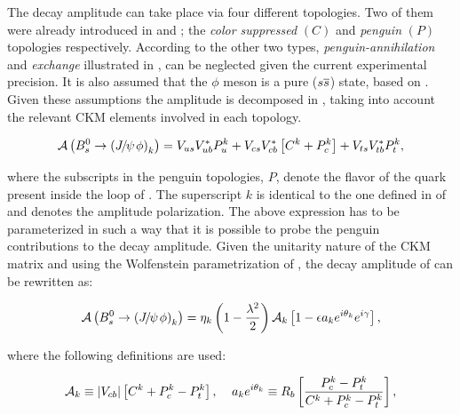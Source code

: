 The \BsJpsiPhi decay amplitude can take place via four different topologies.
Two of them were already introduced in  and ;
the {\it color suppressed }$(C)$ and {\it penguin} $(P)$ topologies respectively.
According to \cite{DeBruyn-thesis,DeBruyn:2014oga} the other two types, {\it penguin-annihilation}
and {\it exchange} illustrated in , can be neglected given the current experimental precision.
It is also assumed that the $\phi$ meson is a pure ($s\overline {s}$) state, based on \cite{Faller:2008gt}.
Given these assumptions the \BsJpsiPhi amplitude is decomposed in ,
taking into account the relevant CKM elements involved in each topology.

\begin{equation}
\mathcal{A} \left( B^0_s\rightarrow \left({J\mskip -3mu/\mskip -2mu\psi\mskip 2mu} \phi\right)_{k} \right) = V_{us}V_{ub}^*P_{u}^k + V_{cs}V_{cb}^*\left[ C^k +P_{c}^k \right] + V_{ts}V_{tb}^*P_{t}^k,
 \label{bsjpsiphi_amp}
\end{equation}

\noindent where the subscripts in the penguin topologies, $P$, denote the flavor of the quark present inside
the loop of . The superscript $k$ is identical to the one defined in 
of  and denotes the \BsJpsiPhi amplitude polarization.
The above expression has to be parameterized in such a way that it is possible to probe the penguin contributions to
the \BsJpsiPhi decay amplitude. Given the unitarity nature of the CKM matrix and using the Wolfenstein parametrization
of , the decay amplitude of  can be rewritten as:

\begin{equation}
  \mathcal{A} \left( B^0_s\rightarrow \left({J\mskip -3mu/\mskip -2mu\psi\mskip 2mu} \phi\right)_{k} \right) = \eta_k  \left( 1-\frac{\lambda^2}{2} \right) \mathcal{A}_{k} \left[  1 - \epsilon a_k e^{i\theta_k} e^{i\gamma}  \right],
 \label{bsjpsiphi_amp_param}
\end{equation}

\noindent where the following definitions are used:

\begin{equation}
  \mathcal{A}_{k} \equiv |V_{cb}| \left[ C^k + P_c^k - P_t^k \right], \;\;\;\; a_k e^{i\theta_k} \equiv R_b \left[  \frac{P_c^k - P_t^k}{C^k + P_c^k - P_t^k}  \right],
  \label{bsjpsiphi_amp_param_defs}
\end{equation}

